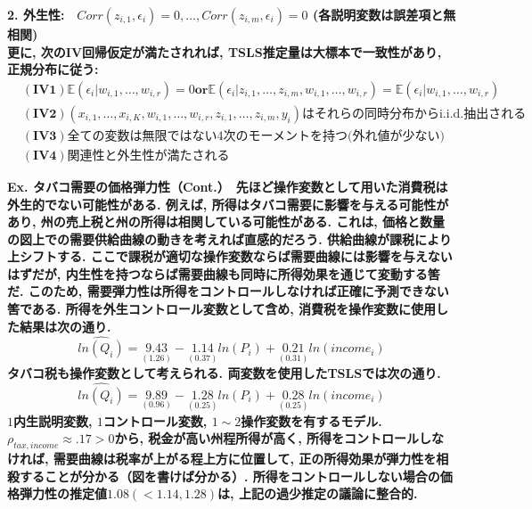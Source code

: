 \documentclass[paper=a4paper,fontsize=10pt]{jlreq}
\begin{document}
\rmfamily\mcfamily\bfseries{2. 外生性}\mdseries :　$Corr(z_{i,1}, \epsilon_i) = 0, \dots, Corr(z_{i,m}, \epsilon_i) = 0$ (各説明変数は誤差項と無相関)\\

更に, 次のIV回帰仮定が満たされれば, TSLS推定量は大標本で一致性があり, 正規分布に従う:
\begin{align*}
  &\mathbf{(IV1)}　\mathbb{E}(\epsilon_i|w_{i,1}, \dots, w_{i,r})=0　\mathbf{or}　\mathbb{E}(\epsilon_i|z_{i,1}, \dots, z_{i,m}, w_{i,1}, \dots, w_{i,r}) = \mathbb{E}(\epsilon_i|w_{i,1}, \dots, w_{i,r})\\
  &\mathbf{(IV2)}　(x_{i,1}, \dots, x_{i,K}, w_{i,1}, \dots, w_{i,r}, z_{i,1}, \dots, z_{i,m}, y_i) \text{はそれらの同時分布からi.i.d.抽出される}\\
  &\mathbf{(IV3)}　\text{全ての変数は無限ではない4次のモーメントを持つ(外れ値が少ない)}\\
  &\mathbf{(IV4)}　\text{関連性と外生性が満たされる}
\end{align*}

\rmfamily\mcfamily\bfseries{Ex. タバコ需要の価格弾力性（Cont.）}\mdseries　先ほど操作変数として用いた消費税は外生的でない可能性がある. 例えば, 所得はタバコ需要に影響を与える可能性があり, 州の売上税と州の所得は相関している可能性がある. これは, 価格と数量の図上での需要供給曲線の動きを考えれば直感的だろう. 供給曲線が課税により上シフトする. ここで課税が適切な操作変数ならば需要曲線には影響を与えないはずだが, 内生性を持つならば需要曲線も同時に所得効果を通じて変動する筈だ. このため, 需要弾力性は所得をコントロールしなければ正確に予測できない筈である. 所得を外生コントロール変数として含め, 消費税を操作変数に使用した結果は次の通り.
\begin{equation*}
  \hat{ln(Q_i)} = \underset{(1.26)}{9.43} - \underset{(0.37)}{1.14}  ln(P_i) + \underset{(0.31)}{0.21}  ln(income_i)
\end{equation*}
タバコ税も操作変数として考えられる. 両変数を使用したTSLSでは次の通り.
\begin{equation*}
  \hat{ln(Q_i)} = \underset{(0.96)}{9.89} - \underset{(0.25)}{1.28}  ln(P_i) + \underset{(0.25)}{0.28}  ln(income_i)
\end{equation*}
$1$内生説明変数, $1$コントロール変数, $1 \sim 2$操作変数を有するモデル. $\rho_{tax, income} \approx .17 > 0$から, 税金が高い州程所得が高く, 所得をコントロールしなければ, 需要曲線は税率が上がる程上方に位置して, 正の所得効果が弾力性を相殺することが分かる（図を書けば分かる）. 所得をコントロールしない場合の価格弾力性の推定値$1.08 (< 1.14, 1.28)$は, 上記の過少推定の議論に整合的.\\
\end{document}
